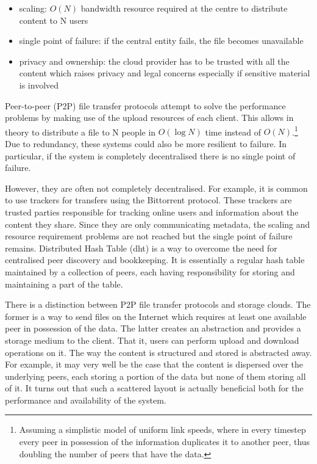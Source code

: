 \documentclass[12pt]{article}
\begin{document}
\begin{itemize}
\item{scaling: $O(N)$ bandwidth resource required at the centre to distribute content to N users}
\item{single point of failure: if the central entity fails, the file becomes unavailable}
\item{privacy and ownership: the cloud provider has to be trusted with all the content which raises privacy and legal concerns especially if sensitive material is involved}
\end{itemize}

Peer-to-peer (P2P) file transfer protocols attempt to solve the performance problems by making use of the upload resources of each client. This allows in theory to distribute a file to N people in $O(\log N)$ time instead of $O(N)$.\footnote{Assuming a simplistic model of uniform link speeds, where in every timestep every peer in possession of the information duplicates it to another peer, thus doubling the number of peers that have the data.} Due to redundancy, these systems could also be more resilient to failure. In particular, if the system is completely decentralised there is no single point of failure.

However, they are often not completely decentralised. For example, it is common to use trackers for transfers using the Bittorrent protocol. These trackers are trusted parties responsible for tracking online users and information about the content they share. Since they are only communicating metadata, the scaling and resource requirement problems are not reached but the single point of failure remains. Distributed Hash Table (\gls{dht}) is a way to overcome the need for centralised peer discovery and bookkeeping. It is essentially a regular hash table maintained by a collection of peers, each having responsibility for storing and maintaining a part of the table.

There is a distinction between P2P file transfer protocols and storage clouds. The former is a way to send files on the Internet which requires at least one available peer in possession of the data. The latter creates an abstraction and provides a storage medium to the client. That it, users can perform upload and download operations on it. The way the content is structured and stored is abstracted away. For example, it may very well be the case that the content is dispersed over the underlying peers, each storing a portion of the data but none of them storing all of it. It turns out that such a scattered layout is actually beneficial both for the performance and availability of the system.
\end{document}
